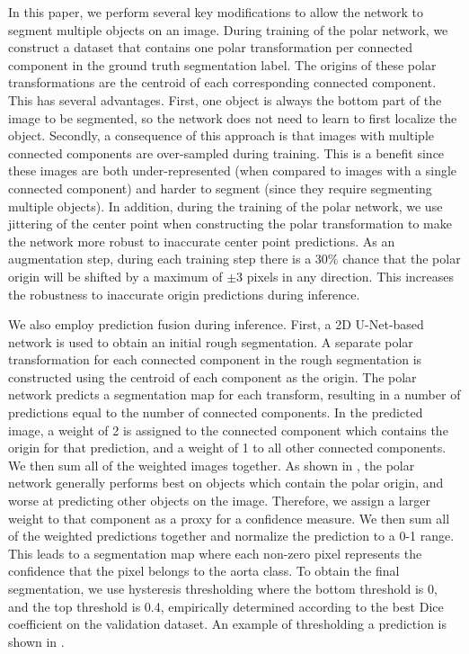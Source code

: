 In this paper, we perform several key modifications to allow the network to segment multiple objects on an image. During training of the polar network, we construct a dataset that contains one polar transformation per connected component in the ground truth segmentation label. The origins of these polar transformations are the centroid of each corresponding connected component. This has several advantages. First, one object is always the bottom part of the image to be segmented, so the network does not need to learn to first localize the object. Secondly, a consequence of this approach is that images with multiple connected components are over-sampled during training. This is a benefit since these images are both under-represented (when compared to images with a single connected component) and harder to segment (since they require segmenting multiple objects). In addition, during the training of the polar network, we use jittering of the center point when constructing the polar transformation to make the network more robust to inaccurate center point predictions. As an augmentation step, during each training step there is a $30\%$ chance that the polar origin will be shifted by a maximum of $\pm3$ pixels in any direction. This increases the robustness to inaccurate origin predictions during inference.

We also employ prediction fusion during inference. First, a 2D U-Net-based network is used to obtain an initial rough segmentation. A separate polar transformation for each connected component in the rough segmentation is constructed using the centroid of each component as the origin. The polar network predicts a segmentation map for each transform, resulting in a number of predictions equal to the number of connected components. In the predicted image, a weight of 2 is assigned to the connected component which contains the origin for that prediction, and a weight of 1 to all other connected components. We then sum all of the weighted images together. As shown in \cite{bencevicTrainingPolarImage2021}, the polar network generally performs best on objects which contain the polar origin, and worse at predicting other objects on the image. Therefore, we assign a larger weight to that component as a proxy for a confidence measure. We then sum all of the weighted predictions together and normalize the prediction to a 0-1 range. This leads to a segmentation map where each non-zero pixel represents the confidence that the pixel belongs to the aorta class. To obtain the final segmentation, we use hysteresis thresholding where the bottom threshold is 0, and the top threshold is 0.4, empirically determined according to the best Dice coefficient on the validation dataset. An example of thresholding a prediction is shown in .

